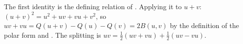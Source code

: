 The first identity is the defining relation of . Applying it to $u + v$: $(u + v)^{2} = u^{2} + uv + vu + v^{2}$, so $uv + vu = Q(u + v) - Q(u) - Q(v) = 2B(u, v)$ by the definition of the polar form and . The splitting is $uv = \tfrac12(uv + vu) + \tfrac12(uv - vu)$.
